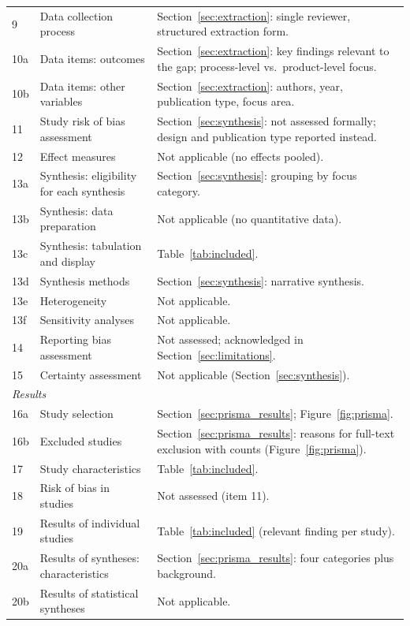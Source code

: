 \documentclass[journal,article,submit,pdftex,moreauthors]{Definitions/mdpi}
\begin{document}
{\begin{longtable}{p{0.7cm}p{3.0cm}p{8.3cm}}
9 & Data collection process & Section~\ref{sec:extraction}: single reviewer, structured extraction form. \\
10a & Data items: outcomes & Section~\ref{sec:extraction}: key findings relevant to the gap; process-level vs.\ product-level focus. \\
10b & Data items: other variables & Section~\ref{sec:extraction}: authors, year, publication type, focus area. \\
11 & Study risk of bias assessment & Section~\ref{sec:synthesis}: not assessed formally; design and publication type reported instead. \\
12 & Effect measures & Not applicable (no effects pooled). \\
13a & Synthesis: eligibility for each synthesis & Section~\ref{sec:synthesis}: grouping by focus category. \\
13b & Synthesis: data preparation & Not applicable (no quantitative data). \\
13c & Synthesis: tabulation and display & Table~\ref{tab:included}. \\
13d & Synthesis methods & Section~\ref{sec:synthesis}: narrative synthesis. \\
13e & Heterogeneity & Not applicable. \\
13f & Sensitivity analyses & Not applicable. \\
14 & Reporting bias assessment & Not assessed; acknowledged in Section~\ref{sec:limitations}. \\
15 & Certainty assessment & Not applicable (Section~\ref{sec:synthesis}). \\
\multicolumn{3}{l}{\textit{Results}} \\
16a & Study selection & Section~\ref{sec:prisma_results}; Figure~\ref{fig:prisma}. \\
16b & Excluded studies & Section~\ref{sec:prisma_results}: reasons for full-text exclusion with counts (Figure~\ref{fig:prisma}). \\
17 & Study characteristics & Table~\ref{tab:included}. \\
18 & Risk of bias in studies & Not assessed (item 11). \\
19 & Results of individual studies & Table~\ref{tab:included} (relevant finding per study). \\
20a & Results of syntheses: characteristics & Section~\ref{sec:prisma_results}: four categories plus background. \\
20b & Results of statistical syntheses & Not applicable. \\

\end{longtable}}
\end{document}
